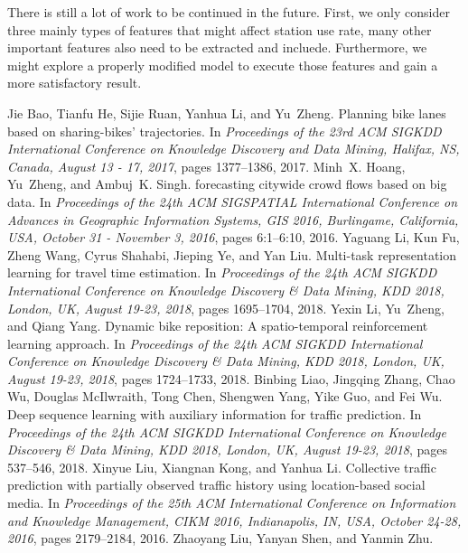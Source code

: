 \documentclass[conference]{IEEEtran}
\begin{document}
There is still a lot of work to be continued in the future. First, we only consider three mainly types of features that might affect station use rate, many other important features also need to be extracted and incluede. Furthermore, we might explore a properly modified model to execute those features and gain a more satisfactory result.


\begin{thebibliography}{00}
 Jie Bao, Tianfu He, Sijie Ruan, Yanhua Li, and Yu~Zheng.
\newblock Planning bike lanes based on sharing-bikes' trajectories.
\newblock In {\em Proceedings of the 23rd {ACM} {SIGKDD} International
	Conference on Knowledge Discovery and Data Mining, Halifax, NS, Canada,
	August 13 - 17, 2017}, pages 1377--1386, 2017.
 Minh~X. Hoang, Yu~Zheng, and Ambuj~K. Singh.
 forecasting citywide crowd flows based on big data.
\newblock In {\em Proceedings of the 24th {ACM} {SIGSPATIAL} International
	Conference on Advances in Geographic Information Systems, {GIS} 2016,
	Burlingame, California, USA, October 31 - November 3, 2016}, pages 6:1--6:10,
2016.
 Yaguang Li, Kun Fu, Zheng Wang, Cyrus Shahabi, Jieping Ye, and Yan Liu.
\newblock Multi-task representation learning for travel time estimation.
\newblock In {\em Proceedings of the 24th {ACM} {SIGKDD} International
	Conference on Knowledge Discovery {\&} Data Mining, {KDD} 2018, London, UK,
	August 19-23, 2018}, pages 1695--1704, 2018.
 Yexin Li, Yu~Zheng, and Qiang Yang.
\newblock Dynamic bike reposition: {A} spatio-temporal reinforcement learning
approach.
\newblock In {\em Proceedings of the 24th {ACM} {SIGKDD} International
	Conference on Knowledge Discovery {\&} Data Mining, {KDD} 2018, London, UK,
	August 19-23, 2018}, pages 1724--1733, 2018.
 Binbing Liao, Jingqing Zhang, Chao Wu, Douglas McIlwraith, Tong Chen, Shengwen
Yang, Yike Guo, and Fei Wu.
\newblock Deep sequence learning with auxiliary information for traffic
prediction.
\newblock In {\em Proceedings of the 24th {ACM} {SIGKDD} International
	Conference on Knowledge Discovery {\&} Data Mining, {KDD} 2018, London, UK,
	August 19-23, 2018}, pages 537--546, 2018.
 Xinyue Liu, Xiangnan Kong, and Yanhua Li.
\newblock Collective traffic prediction with partially observed traffic history
using location-based social media.
\newblock In {\em Proceedings of the 25th {ACM} International Conference on
	Information and Knowledge Management, {CIKM} 2016, Indianapolis, IN, USA,
	October 24-28, 2016}, pages 2179--2184, 2016.
 Zhaoyang Liu, Yanyan Shen, and Yanmin Zhu.

\end{thebibliography}
\end{document}
